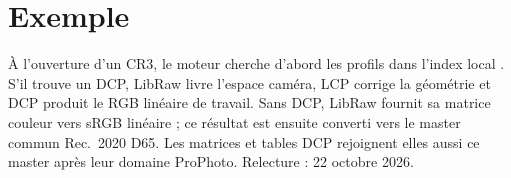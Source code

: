 \section{Exemple}
À l'ouverture d'un CR3, le moteur cherche d'abord les profils dans l'index local . S'il trouve un DCP, LibRaw livre l'espace caméra, LCP corrige la géométrie et DCP produit le RGB linéaire de travail. Sans DCP, LibRaw fournit sa matrice couleur vers sRGB linéaire ; ce résultat est ensuite converti vers le master commun Rec.~2020 D65. Les matrices et tables DCP rejoignent elles aussi ce master après leur domaine ProPhoto. Relecture : 22 octobre 2026.



